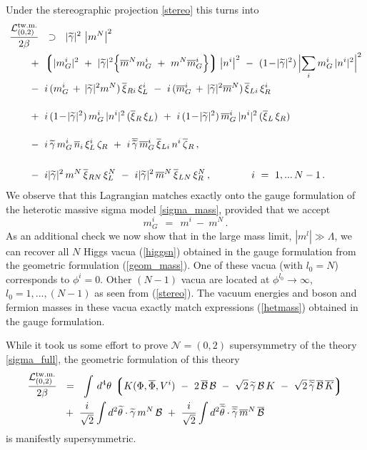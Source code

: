 \documentclass[12pt]{article}
\newcommand{\ntwoo}{${\mathcal N}= \left(0,2\right) $ }
\newcommand{\wt}{\widetilde}
\newcommand{\ov}{\overline}
\newcommand{\mc}[1]{\mathcal{#1}}
\newcommand{\lgr}{\left\lgroup}
\newcommand{\rgr}{\right\rgroup}
\newcommand{\bxir}{\ov{\xi}{}_R}
\newcommand{\bxil}{\ov{\xi}{}_L}
\newcommand{\xir}{\xi_R}
\newcommand{\xil}{\xi_L}
\newcommand{\bzr}{\ov{\zeta}{}_R}
\newcommand{\zr}{\zeta_R}
\newcommand{\tgamma}{\wt{\gamma}}
\newcommand{\btgamma}{\ov{\tgamma}}
\newcommand{\bxi}{\ov{\xi}{}}
\begin{document}
Under the stereographic projection \eqref{stereo} this turns into
\begin{align*}
%
	\frac{\mc{L}_{(0,2)}^\text{tw.m.}}{2\beta} & 
	~~\supset~~ 
	|\tgamma|^2\, \left|m^N\right|^2 
	\\
%
	&\!\!\!\!\!\!\!\!
	~+~
	\lgr |m_G^i|^2 ~+~
		|\tgamma|^2 \Bigl\{ \ov{m}{}^N m_G^i ~+~ m^N \ov{m}{}_G^i \Bigr\} \rgr \left|n^i \right|^2 
	~-~ (1 \!-\! |\tgamma|^2)\, \Bigl| \sum_i m_G^i\, |n^i|^2 \Bigr|^2 
	\\
%
	&\!\!\!\!\!\!\!\!
	~-~ i\, ( m_G^i \,+\, |\tgamma|^2 m^N )\, \bxi_{Ri}\, \xi_L^i
	~-~ i\, (\ov{m}{}_G^i \,+\, |\tgamma|^2 \ov{m}{}^N )\, \bxi_{Li}\, \xi_R^i
	\\[4mm]
%
	&\!\!\!\!\!\!\!\!
	~+~ i\,(1\!-\!|\tgamma|^2)\, m_G^i\,|n^i|^2\, (\bxir\,\xil) 
	~+~ i\,(1\!-\!|\tgamma|^2)\, \ov{m}{}_G^i\,|n^i|^2\, (\bxil\,\xir)
	\\[4mm]
%
	&\!\!\!\!\!\!\!\!
	~-~ i\,\tgamma\, m_G^i\,\ov{n}{}_i\, \xi_L^i\, \zr
	~+~ i\,\btgamma\, \ov{m}{}_G^i\, \bxi_{Li}\, n^i\, \bzr\,,
	\\[5mm]
%
	&\!\!\!\!\!\!\!\!
	~-~ i |\tgamma|^2\, m^N\, \ov{\xi}{}_{RN}\, \xi_L^N
	~-~ i |\tgamma|^2\, \ov{m}^N\, \ov{\xi}{}_{LN}\, \xi_R^N\,,
	\qquad\qquad
	i ~=~ 1,...\,N-1\,.
\end{align*}
	We observe that this Lagrangian matches exactly
	onto the gauge formulation of the heterotic massive sigma model \eqref{sigma_mass}, provided that
	we accept
\[
	m_G^i ~~=~~ m^i ~-~ m^N \,.
\]
As an additional check we now show that in the 
large  mass limit, $|m^l|\gg \Lambda$, we can
recover all $N$ Higgs vacua (\ref{higgsn}) obtained in the
gauge formulation from the geometric formulation (\ref{geom_mass}). One of these vacua (with $l_0=N$) corresponds
to $\phi^i=0$. Other $(N-1)$ vacua are located at $\phi^{l_0}\to\infty$, $l_0=1,...,(N-1)$ as  seen from 
(\ref{stereo}). The vacuum energies and boson and fermion masses 
in these vacua exactly match expressions (\ref{hetmass})
obtained in the gauge formulation.

	While it took us some effort to prove \ntwoo supersymmetry of the theory \eqref{sigma_full},
	the geometric formulation of this theory 
\begin{align*}
	\frac{\mc{L}_{(0,2) }^\text{tw.m.}}{2\beta} & 
	~~=~~ \int\, d^4\theta\, \lgr K(\Phi,\ov{\Phi}, V^i) 
		~-~ 2\, \ov{\mc{B}}\,\mc{B}  
		~-~  \sqrt{2}\, \tgamma\,\mc{B}\,K  ~-~ \sqrt{2}\, \ov{\tgamma}\,\ov{\mc{B}}\,\ov{K} \rgr
	\\
%
	&~
	~+~ \frac{i}{\sqrt{2}} \int d^2\wt{\theta} \cdot \tgamma\,m^N\,\mc{B} 
	~+~ \frac{i}{\sqrt{2}} \int d^2\ov{\wt{\theta}} \cdot \btgamma\, \ov{m}{}^N\, \ov{\mc{B}}
\end{align*}
	is manifestly supersymmetric.
	
\end{document}
